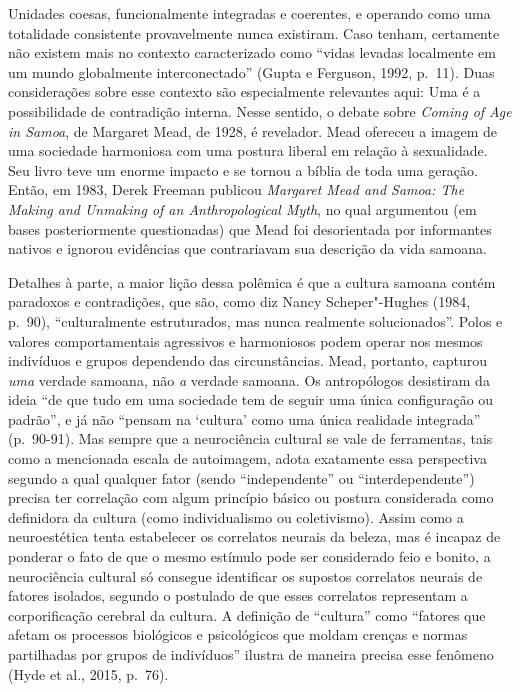 Unidades coesas, funcionalmente integradas e coerentes, e operando como
uma totalidade consistente provavelmente nunca existiram. Caso tenham,
certamente não existem mais no contexto caracterizado como ``vidas
levadas localmente em um mundo globalmente interconectado'' (Gupta e
Ferguson, 1992, p.~11). Duas considerações sobre esse contexto são
especialmente relevantes aqui: Uma é a possibilidade de contradição
interna. Nesse sentido, o debate sobre \emph{Coming of Age in Samoa}, de
Margaret Mead, de 1928, é revelador. Mead ofereceu a imagem de uma
sociedade harmoniosa com uma postura liberal em relação à sexualidade.
Seu livro teve um enorme impacto e se tornou a bíblia de toda uma
geração. Então, em 1983, Derek Freeman publicou \emph{Margaret Mead and
Samoa: The Making and Unmaking of an Anthropological Myth}, no qual
argumentou (em bases posteriormente questionadas) que Mead foi
desorientada por informantes nativos e ignorou evidências que
contrariavam sua descrição da vida samoana.

Detalhes à parte, a maior lição dessa polêmica é que a cultura samoana
contém paradoxos e contradições, que são, como diz Nancy Scheper"-Hughes
(1984, p.~90), ``culturalmente estruturados, mas nunca realmente
solucionados''. Polos e valores comportamentais agressivos e harmoniosos
podem operar nos mesmos indivíduos e grupos dependendo das
circunstâncias. Mead, portanto, capturou \emph{uma} verdade samoana, não
\emph{a} verdade samoana. Os antropólogos desistiram da ideia ``de que
tudo em uma sociedade tem de seguir uma única configuração ou padrão'',
e já não ``pensam na `cultura' como uma única realidade integrada''
(p.~90-91). Mas sempre que a neurociência cultural se vale de
ferramentas, tais como a mencionada escala de autoimagem, adota
exatamente essa perspectiva segundo a qual qualquer fator (sendo
``independente'' ou ``interdependente'') precisa ter correlação com
algum princípio básico ou postura considerada como definidora da cultura
(como individualismo ou coletivismo). Assim como a neuroestética tenta
estabelecer os correlatos neurais da beleza, mas é incapaz de ponderar o
fato de que o mesmo estímulo pode ser considerado feio e bonito, a
neurociência cultural só consegue identificar os supostos correlatos
neurais de fatores isolados, segundo o postulado de que esses correlatos
representam a corporificação cerebral da cultura. A definição de
``cultura'' como ``fatores que afetam os processos biológicos e
psicológicos que moldam crenças e normas partilhadas por grupos de
indivíduos'' ilustra de maneira precisa esse fenômeno (Hyde et al.,
2015, p.~76).

